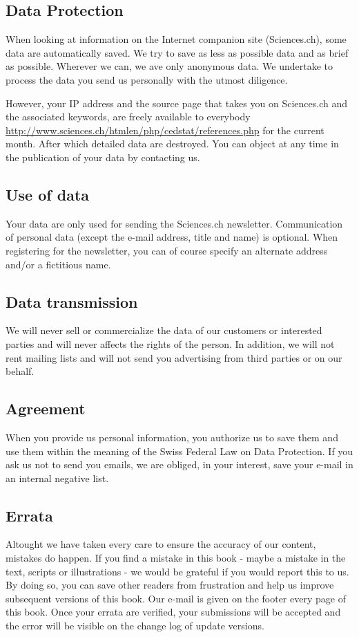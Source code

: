 	\pagebreak
	\subsection{Data Protection}
	When looking at information on the Internet companion site (Sciences.ch), some data are automatically saved. We try to save as less as possible data and as brief as possible. Wherever we can, we ave only anonymous data. We undertake to process the data you send us personally with the utmost diligence.

	However, your IP address and the source page that takes you on Sciences.ch and the associated keywords, are freely available to everybody \href{here}{http://www.sciences.ch/htmlen/php/cedstat/references.php} for the current month. After which detailed data are destroyed. You can object at any time in the publication of your data by contacting us.

	\subsection{Use of data}

	Your data are only used for sending the Sciences.ch newsletter. Communication of personal data (except the e-mail address, title and name) is optional. When registering for the newsletter, you can of course specify an alternate address and/or a fictitious name.

	\subsection{Data transmission}

	We will never sell or commercialize the data of our customers or interested parties and will never affects the rights of the person. In addition, we will not rent mailing lists and will not send you advertising from third parties or on our behalf.

	\subsection{Agreement}

	When you provide us personal information, you authorize us to save them and use them within the meaning of the Swiss Federal Law on Data Protection. If you ask us not to send you emails, we are obliged, in your interest, save your e-mail in an internal negative list.
	
	\subsection{Errata}
	Altought we have taken every care to ensure the accuracy of our content, mistakes do happen. If you find a mistake in this book - maybe a mistake in the text, scripts or illustrations - we would be grateful if you would report this to us. By doing so, you can save other readers from frustration and help us improve subsequent versions of this book. Our e-mail is given on the footer every page of this book. Once your errata are verified, your submissions will be accepted and the error will be visible on the change log of update versions.

